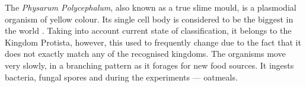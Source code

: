 The \textit{Physarum Polycephalum}, also known as a true slime mould, is a plasmodial organism of yellow colour. Its single cell body is considered to be the biggest in the world \cite{TODO}. Taking into account current state of classification, it belongs to the Kingdom Protista, however, this used to frequently change due to the fact that it does not exactly match any of the recognised kingdoms. The organisms move very slowly, in a branching pattern as it forages for new food sources. It ingests bacteria, fungal spores and during the experiments --- oatmeals.








